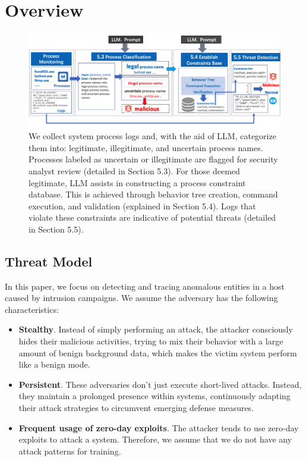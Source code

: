 \section{Overview}

\begin{figure}[h]
    \centering
      \includegraphics[width=1\textwidth]{figs/framework.jpg}
    \caption{We collect system process logs and, with the aid of LLM, categorize them into: legitimate, illegitimate, and uncertain process names. Processes labeled as uncertain or illegitimate are flagged for security analyst review (detailed in Section 5.3). For those deemed legitimate, LLM assists in constructing a process constraint database. This is achieved through behavior tree creation, command execution, and validation (explained in Section 5.4). Logs that violate these constraints are indicative of potential threats (detailed in Section 5.5).}
    \label{fig-framework}
    \end{figure}

\subsection{Threat Model}
In this paper, we focus on detecting and tracing anomalous entities in a host caused by intrusion campaigns. We assume the adversary has the following characteristics:

\begin{itemize}
    \item \textbf{Stealthy}. Instead of simply performing an attack, the attacker consciously hides their malicious activities, trying to mix their behavior with a large amount of benign background data, which makes the victim system perform like a benign mode.
    \item \textbf{Persistent}. These adversaries don't just execute short-lived attacks. Instead, they maintain a prolonged presence within systems, continuously adapting their attack strategies to circumvent emerging defense measures.
    \item \textbf{Frequent usage of zero-day exploits}. The attacker tends to use zero-day exploits to attack a system. Therefore, we assume that we do not have any attack patterns for training.
\end{itemize}



